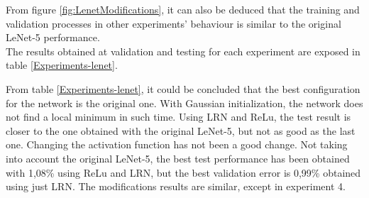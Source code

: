 From figure \ref{fig:LenetModifications},  it can also be deduced that the training and validation processes in other experiments' behaviour is similar to the original LeNet-5 performance.\\

The results obtained at validation and testing for each experiment are exposed in table \ref{Experiments-lenet}.

\begin{table}[tb]
\centering
{}
\caption{Lenet-5 experiments results.}\label{Experiments-lenet}
\end{table}

From table \ref{Experiments-lenet}, it could be concluded that the best configuration for the network is the original one. With Gaussian initialization, the network does not find a local minimum in such time. Using LRN and ReLu, the test result is closer to the one obtained with the original LeNet-5, but not as good as the last one. Changing the activation function has not been a good change. Not taking into account the original LeNet-5, the best test performance has been obtained with 1,08\% using ReLu and LRN, but the best validation error is 0,99\% obtained using just LRN. The modifications results are similar, except in experiment 4.

